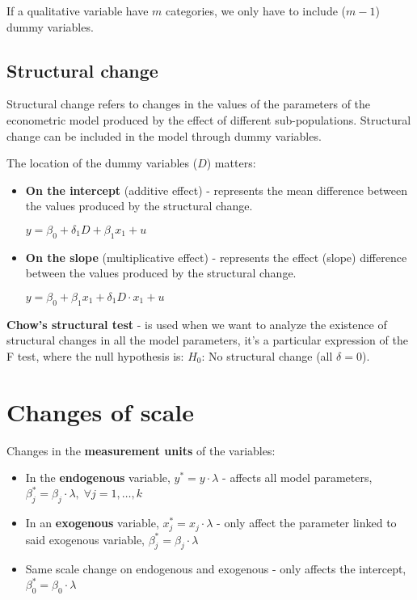 \documentclass[10pt, a4paper, landscape]{extarticle}
\begin{document}
\begin{multicols}{3}
If a qualitative variable have $m$ categories, we only have to include ($m - 1$) dummy variables.

\subsection*{Structural change}

Structural change refers to changes in the values of the parameters of the econometric model produced by the effect of different sub-populations. Structural change can be included in the model through dummy variables.

The location of the dummy variables ($D$) matters:

\begin{itemize}[leftmargin=*]
	\item \textbf{On the intercept} (additive effect) - represents the mean difference between the values produced by the structural change.
	\begin{center}
		$y = \beta_0 + \delta_1 D + \beta_1 x_1 + u$
	\end{center}
	\item \textbf{On the slope} (multiplicative effect) - represents the effect (slope) difference between the values produced by the structural change.
	\begin{center}
		$y = \beta_0 + \beta_1 x_1 + \delta_1 D \cdot x_1 + u$
	\end{center}
\end{itemize}

\textbf{Chow's structural test} - is used when we want to analyze the existence of structural changes in all the model parameters, it's a particular expression of the F test, where the null hypothesis is: $H_0$: No structural change (all $\delta = 0$).

\section*{Changes of scale}

Changes in the \textbf{measurement units} of the variables:

\begin{itemize}[leftmargin=*]
	\item In the \textbf{endogenous} variable, $y^* = y \cdot \lambda$ - affects all model parameters, $\beta_j^* = \beta_j \cdot \lambda, \; \forall j = 1, \ldots, k$
	\item In an \textbf{exogenous} variable, $x_j^* = x_j \cdot \lambda$ - only affect the parameter linked to said exogenous variable, $\beta_j^* = \beta_j \cdot \lambda$
	\item Same scale change on endogenous and exogenous - only affects the intercept, $\beta_0^* = \beta_0 \cdot \lambda$
\end{itemize}


\end{multicols}
\end{document}
